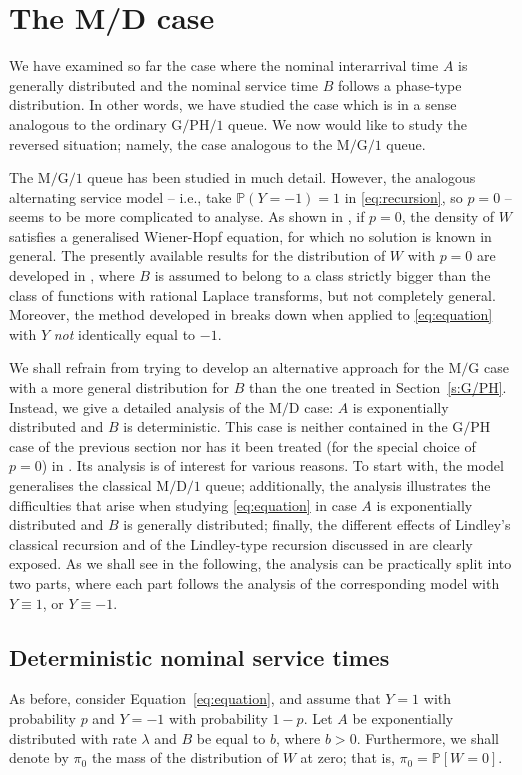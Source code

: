 \documentclass[reqno, 11pt, a4paper]{article}
\theoremstyle{plain}
\theoremstyle{remark}
\numberwithin{equation}{section}
\begin{document}
\section{The M/D case}\label{s:M/D}
We have examined so far the case where the nominal interarrival time $A$ is generally distributed and the nominal service time $B$ follows a phase-type distribution. In other words, we have studied the case which is in a sense analogous to the ordinary $\mathrm{G/PH/1}$ queue. We now would like to study the reversed situation; namely, the case analogous to the $\mathrm{M/G/1}$ queue.

The $\mathrm{M/G/1}$ queue has been studied in much detail. However, the analogous alternating service model -- i.e.,
take ${\mathbb{P}}(Y=-1)=1$ in \eqref{eq:recursion}, so $p=0$ -- seems to be more complicated to analyse. As shown in \cite{vlasiou05a}, if $p=0$, the density of $W$ satisfies a generalised Wiener-Hopf equation, for which no solution is known in general. The presently available results for the distribution of $W$ with $p=0$ are developed in \cite{vlasiou05a}, where $B$ is assumed to belong to a class strictly bigger than the class of functions with rational Laplace transforms, but not completely general. Moreover, the method developed in \cite{vlasiou05a} breaks down when applied to \eqref{eq:equation} with $Y$ {\em not} identically equal to $-1$.

We shall refrain from trying to develop an alternative approach for the $\mathrm{M/G}$ case with a more general distribution for $B$ than the one treated in Section~\ref{s:G/PH}. Instead, we give a detailed analysis of the $\mathrm{M/D}$ case: $A$ is exponentially distributed and $B$ is deterministic. This case is neither contained in the $\mathrm{G/PH}$ case of the previous section nor has it been treated (for the special choice of $p=0$) in \cite{vlasiou05a}. Its analysis is of interest for various reasons. To start with, the model generalises the classical $\mathrm{M/D/1}$ queue; additionally, the analysis illustrates the difficulties that arise when studying \eqref{eq:equation} in case $A$ is exponentially distributed and $B$ is generally distributed; finally, the different
effects of Lindley's classical recursion and of the Lindley-type recursion discussed in \cite{vlasiou05a} are clearly exposed. As we shall see in the following, the analysis can be practically split into two parts, where each part follows the analysis of the corresponding model with $Y \equiv 1$, or $Y \equiv -1$.

\subsection{Deterministic nominal service times}
As before, consider Equation~\eqref{eq:equation}, and assume that $Y=1$ with probability $p$ and $Y=-1$ with probability $1-p$. Let $A$ be exponentially distributed with rate $\lambda$ and $B$ be equal to $b$, where $b>0$. Furthermore, we shall denote by $\pi_0$ the mass of the distribution of $W$ at zero; that is, $\pi_0={\mathbb{P}}[W=0]$.
\end{document}
